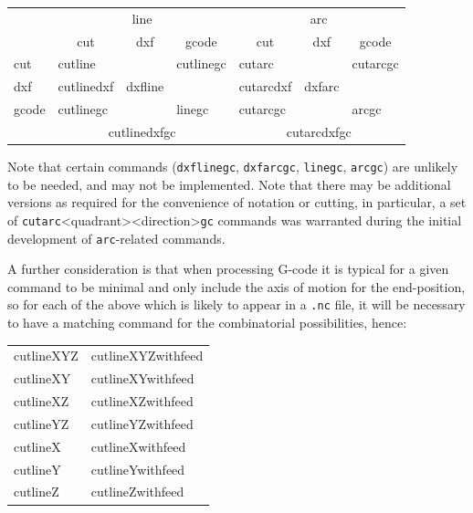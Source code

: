 \documentclass{ltxdoc}
\begin{document}
\begin{center}
\noindent\begin{tabular}{lllllll}\toprule
& \multicolumn{3}{c}{line} & \multicolumn{3}{c}{arc}
\\\cmidrule(lr){2-4}\cmidrule(lr){5-7}
      & \multicolumn{1}{c}{cut}& \multicolumn{1}{c}{dxf}& \multicolumn{1}{c}{gcode}& \multicolumn{1}{c}{cut}& \multicolumn{1}{c}{dxf}& \multicolumn{1}{c}{gcode}\\\midrule
cut   & cutline\hphantom{dxf}  &                        &  cutlinegc               & cutarc\hphantom{dxf}   &                        & cutarcgc            \\
dxf   & cutlinedxf             & dxfline\hphantom{gc}   &                          & cutarcdxf              & dxfarc\hphantom{gc}    &                     \\
gcode & cutlinegc              & \hphantom{dxflinegc}   & linegc\hphantom{cut}     & cutarcgc               & \hphantom{dxfarcgc}    & arcgc\hphantom{cut} \\\cmidrule(ll){2-4}\cmidrule(ll){5-7}
& \multicolumn{3}{c}{cutlinedxfgc}                                         & \multicolumn{3}{c}{cutarcdxfgc}\\\bottomrule
\end{tabular}
\end{center}

\noindent Note that certain commands (\verb|dxflinegc|, \verb|dxfarcgc|, \verb|linegc|, \verb|arcgc|) are unlikely to be needed, and may not be implemented. Note that there may be additional versions as required for the convenience of notation or cutting, in particular, a set of \verb|cutarc|<quadrant><direction>\verb|gc| commands was warranted during the initial development of \verb|arc|-related commands.

A further consideration is that when processing G-code it is typical for a given command to be minimal and only include the axis of motion for the end-position, so for each of the above which is likely to appear in a \verb|.nc| file, it will be necessary to have a matching command for the combinatorial possibilities, hence:

\begin{center}
\noindent\begin{tabular}{ll}\toprule
cutlineXYZ  & cutlineXYZwithfeed\\
cutlineXY   & cutlineXYwithfeed\\
cutlineXZ  & cutlineXZwithfeed\\
cutlineYZ   & cutlineYZwithfeed\\
cutlineX   & cutlineXwithfeed\\
cutlineY   & cutlineYwithfeed\\
cutlineZ   & cutlineZwithfeed\\\bottomrule
\end{tabular}
\end{center}
\end{document}
